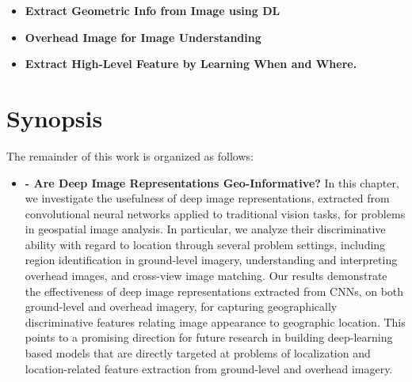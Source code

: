\begin{itemize}[noitemsep]

  \item \textbf{Extract Geometric Info from Image using DL}

  \item \textbf{Overhead Image for Image Understanding}

  \item \textbf{Extract High-Level Feature by Learning When and Where.}

\end{itemize}


\section{Synopsis}

The remainder of this work is organized as follows:
  
\begin{itemize}[noitemsep]

  \item \textbf{ - Are Deep Image Representations
    Geo-Informative?} \newline \newline In this chapter, we
    investigate the usefulness of deep image representations,
    extracted from convolutional neural networks applied to
    traditional vision tasks, for problems in geospatial image
    analysis. In particular, we analyze their discriminative ability
    with regard to location through several problem settings,
    including region identification in ground-level imagery,
    understanding and interpreting overhead images, and cross-view
    image matching.  Our results demonstrate the effectiveness of deep
    image representations extracted from CNNs, on both ground-level
    and overhead imagery, for capturing geographically discriminative
    features relating image appearance to geographic location.  This
    points to a promising direction for future research in building
    deep-learning based models that are directly targeted at problems
    of localization and location-related feature extraction from
    ground-level and overhead imagery. \newline

\end{itemize}
